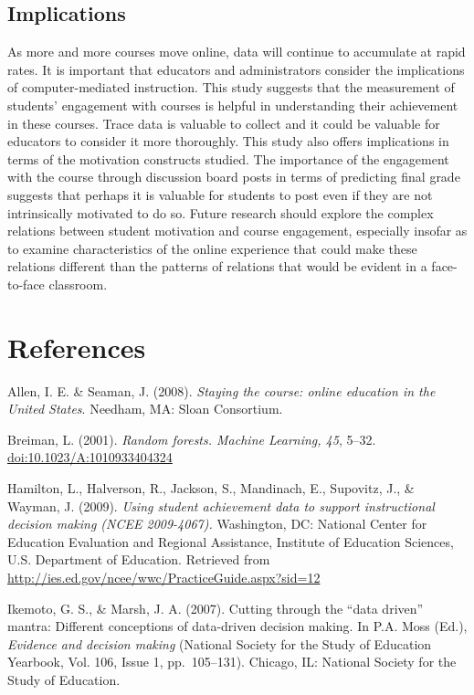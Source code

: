 \documentclass[,acmart]{apa6}
\begin{document}
\subsection{Implications}\label{implications}

As more and more courses move online, data will continue to accumulate
at rapid rates. It is important that educators and administrators
consider the implications of computer-mediated instruction. This study
suggests that the measurement of students' engagement with courses is
helpful in understanding their achievement in these courses. Trace data
is valuable to collect and it could be valuable for educators to
consider it more thoroughly. This study also offers implications in
terms of the motivation constructs studied. The importance of the
engagement with the course through discussion board posts in terms of
predicting final grade suggests that perhaps it is valuable for students
to post even if they are not intrinsically motivated to do so. Future
research should explore the complex relations between student motivation
and course engagement, especially insofar as to examine characteristics
of the online experience that could make these relations different than
the patterns of relations that would be evident in a face-to-face
classroom.

\section{References}\label{references}

\begingroup
\setlength{\parindent}{-0.5in} \setlength{\leftskip}{0.5in}

Allen, I. E. \& Seaman, J. (2008). \emph{Staying the course: online
education in the United States}. Needham, MA: Sloan Consortium.

Breiman, L. (2001). \emph{Random forests. Machine Learning, 45}, 5--32.
\url{doi:10.1023/A:1010933404324}

Hamilton, L., Halverson, R., Jackson, S., Mandinach, E., Supovitz, J.,
\& Wayman, J. (2009). \emph{Using student achievement data to support
instructional decision making (NCEE 2009-4067).} Washington, DC:
National Center for Education Evaluation and Regional Assistance,
Institute of Education Sciences, U.S. Department of Education. Retrieved
from \url{http://ies.ed.gov/ncee/wwc/PracticeGuide.aspx?sid=12}

Ikemoto, G. S., \& Marsh, J. A. (2007). Cutting through the
\enquote{data driven} mantra: Different conceptions of data-driven
decision making. In P.A. Moss (Ed.), \emph{Evidence and decision making}
(National Society for the Study of Education Yearbook, Vol. 106, Issue
1, pp.~105--131). Chicago, IL: National Society for the Study of
Education.
\end{document}
